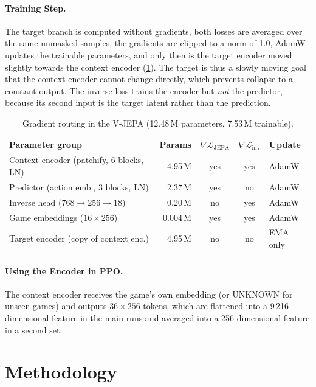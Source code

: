 \documentclass[runningheads]{llncs}
\begin{document}
\paragraph{Training Step.} The target branch is computed without gradients, both losses are
averaged over the same unmasked samples, the gradients are clipped to a norm of 1.0, AdamW
updates the trainable parameters, and only then is the target encoder moved slightly towards the context encoder (\cref{tab:grad}). The target is thus a slowly moving goal that the context encoder cannot change directly,
which prevents collapse to a constant output.
The inverse loss trains the encoder but \emph{not} the predictor, because its second input is
the target latent rather than the prediction.

\begin{table}[!htbp]
\centering
\caption{Gradient routing in the V-JEPA (12.48\,M parameters, 7.53\,M trainable).}
\label{tab:grad}
\footnotesize\setlength{\tabcolsep}{4pt}
\begin{tabular}{@{}lrccl@{}}
\toprule
Parameter group & Params & $\nabla\mathcal{L}_{\text{JEPA}}$ & $\nabla\mathcal{L}_{\text{inv}}$ & Update \\
\midrule
Context encoder (patchify, 6 blocks, LN) & 4.95\,M & yes & yes & AdamW \\
Predictor (action emb., 3 blocks, LN) & 2.37\,M & yes & no & AdamW \\
Inverse head ($768\to256\to18$) & 0.20\,M & no & yes & AdamW \\
Game embeddings ($16\times256$) & 0.004\,M & yes & yes & AdamW \\
Target encoder (copy of context enc.) & 4.95\,M & no & no & EMA only \\
\bottomrule
\end{tabular}
\end{table}

\paragraph{Using the Encoder in PPO.} The context encoder receives the game's own embedding (or UNKNOWN for
unseen games) and outputs $36\times256$ tokens, which are flattened into a 9\,216-dimensional
feature in the main runs and averaged into a 256-dimensional feature in a second set.

\section{Methodology}
\label{sec:method}
\end{document}

